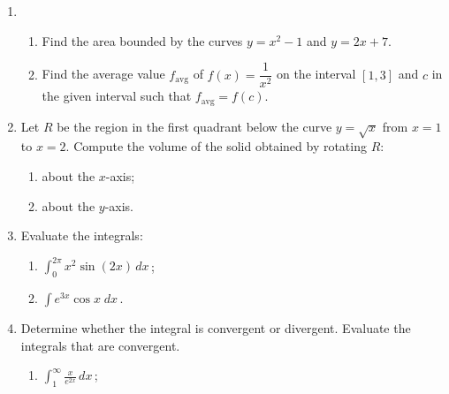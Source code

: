 \documentclass[10pt]{article}
\begin{document}
\begin{enumerate}

\item 
\begin{enumerate}

	\item Find the area bounded by the curves $y=x^2-1$ and $y=2x+7$.
	
	\item Find the average value $f_{\mathrm{avg}}$ of $f(x)=\dfrac{1}{x^2}$ on the interval $[1,3]$ and $c$ in the given interval such that $f_{\mathrm{avg}}=f(c)$.
	
\end{enumerate}

\item Let $R$ be the region in the first quadrant below the curve $y=\sqrt{x}$ from $x=1$ to $x=2$. Compute the volume of the solid obtained by rotating $R$:
\begin{multicols}{2}
\begin{enumerate}

\item about the $x$-axis;

\item about the $y$-axis.

\end{enumerate}
\end{multicols}

\item Evaluate the integrals:

\begin{multicols}{2}
\begin{enumerate}

\item $\displaystyle{\int_{0}^{2\pi}x^2 \sin(2x)\,dx}$\,;

\item $\displaystyle \int e^{3x} \cos x \; dx$\,.

\end{enumerate}
\end{multicols}

\item Determine whether the integral is convergent or divergent. Evaluate the integrals that are convergent.

\begin{multicols}{2}
\begin{enumerate}

\item $ \displaystyle\int_{1}^{\infty}\frac{x}{e^{2x}}\,dx$\,;
 

\end{enumerate}
\end{multicols}
\end{enumerate}
\end{document}
